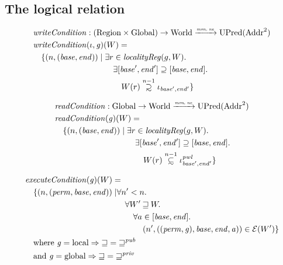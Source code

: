 \documentclass[a4paper]{article}
\newcommand{\monnefun}{\xrightarrow{\textit{\tiny{mon, ne}}}}
\newcommand{\fun}{\rightarrow}
\newcommand\subsetsim{\mathrel{\ooalign{\raise.2ex\hbox{$\subset$}\cr
      \hidewidth\lower.8ex\hbox{\scalebox{0.9}{$\sim$}}\hidewidth\cr}}}
\newcommand\supsetsim{\mathrel{\ooalign{\raise.2ex\hbox{$\supset$}\cr
      \hidewidth\lower.8ex\hbox{\scalebox{0.9}{$\sim$}}\hidewidth\cr}}}
\newcommand{\nsubsim}[1][n]{\stackrel{\tiny{#1}}{\subsetsim}}
\newcommand{\nsupsim}[1][n]{\stackrel{\tiny{#1}}{\supsetsim}}
\newcommand{\var}[1]{\mathit{#1}}
\newcommand{\gl}{\var{g}}
\newcommand{\addr}{\var{a}}
\newcommand{\start}{\var{base}}
\newcommand{\addrend}{\var{end}}
\newcommand{\perm}{\var{perm}}
\newcommand{\pwl}{\var{pwl}}
\newcommand{\plainfun}[2]{
  \ifthenelse{\equal{#2}{}}
  {\mathit{#1}}
  {\mathit{#1}(#2)}
}
\newcommand{\readCond}[1]{\plainfun{readCondition}{#1}}
\newcommand{\writeCond}[1]{\plainfun{writeCondition}{#1}}
\newcommand{\execCond}[1]{\plainfun{executeCondition}{#1}}
\newcommand{\future}{\mathbin{\sqsupseteq}}
\newcommand{\futurewk}{\mathbin{\sqsupseteq}^{\var{pub}}}
\newcommand{\futurestr}{\mathbin{\sqsupseteq}^{\var{priv}}}
\newcommand{\asmType}{\plaindom{AsmType}}
\newcommand{\plaindom}[1]{\mathrm{#1}}
\newcommand{\Addrs}{\plaindom{Addr}}
\newcommand{\Globals}{\plaindom{Global}}
\newcommand{\Regions}{\plaindom{Region}}
\newcommand{\Worlds}{\plaindom{World}}
\newcommand{\UPred}[1]{\plaindom{UPred}(#1)}
\newcommand{\intr}[2]{\mathcal{#1}}
\newcommand{\exprintr}[1]{\intr{E}{#1}}
\newcommand{\stder}{\exprintr{\asmType}}
\newcommand{\npair}[2][n]{\left(#1,#2 \right)}
\newcommand{\plainperm}[1]{\mathrm{#1}}
\newcommand{\local}{\plainperm{local}}
\newcommand{\glob}{\plainperm{global}}
\begin{document}
\begin{lemma}
\subsection{The logical relation}

\begin{align*}
  & \writeCond{} : (\Regions \times \Globals) \fun \Worlds \monnefun \UPred{\Addrs^2}  \\
  & \writeCond{}(\iota,\gl)(W) =  \\
  & \quad \begin{aligned}[t]
    \{ \npair{(\start,\addrend)} \mid & \;\exists r \in \var{localityReg}(g,W) \ldotp \\
    & \;\quad \exists [\start',\addrend'] \supseteq [\start,\addrend] \ldotp \\
    & \;\qquad W(r)\nsupsim[n-1] \iota_{\start',\addrend'} \}
  \end{aligned}
\end{align*}

\begin{align*}
  & \readCond{} : \Globals \fun \Worlds \monnefun \UPred{\Addrs^2}  \\
  & \readCond{}(\gl)(W) =  \\
  & \quad \begin{aligned}[t]
    \{ \npair{(\start,\addrend)} \mid & \;\exists r \in \var{localityReg}(g,W) \ldotp \\
    & \;\quad \exists [\start',\addrend'] \supseteq [\start,\addrend] \ldotp \\
    & \;\qquad W(r)\nsubsim[n-1] \iota_{\start',\addrend'}^\pwl \}
  \end{aligned}
\end{align*}

\begin{align*}
  & \execCond{}(\gl)(W) = \\
  & \quad
    \begin{aligned}[t]
      \{ \npair{(\perm,\start,\addrend)} \mid &  \forall n' < n \ldotp\\
      & \quad \forall W' \future W \ldotp\\
      & \qquad\forall a \in [\start,\addrend] \ldotp\\
      & \qquad \quad \npair[n']{((\perm,\gl),\start,\addrend,\addr)} \in \stder(W')\}
    \end{aligned} \\
  & \quad \text{where } \gl = \local \Rightarrow \future = \futurewk \\
  & \quad \text{and } \gl = \glob \Rightarrow \future = \futurestr
\end{align*}


\end{lemma}
\end{document}
